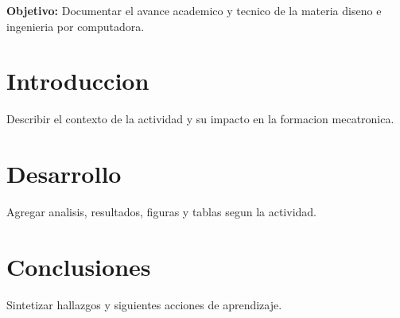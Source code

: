 \documentclass[spanish,letterpaper,oneside]{article}
\begin{document}
\templatePortrait
\templatePagecfg
\onehalfspacing

\begin{abstractd}
\textbf{Objetivo:} Documentar el avance academico y tecnico de la materia diseno e ingenieria por computadora.
\end{abstractd}

\templateIndex
\templateFinalcfg

\section{Introduccion}
Describir el contexto de la actividad y su impacto en la formacion mecatronica.

\section{Desarrollo}
Agregar analisis, resultados, figuras y tablas segun la actividad.

\section{Conclusiones}
Sintetizar hallazgos y siguientes acciones de aprendizaje.



\end{document}
